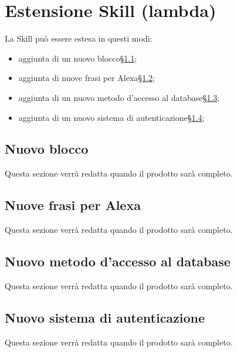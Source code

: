 \section{Estensione Skill (lambda)}
La Skill può essere estesa in questi modi:
\begin{itemize}
    \item aggiunta di un nuovo blocco\S\ref{newBlock};
    \item aggiunta di nuove frasi per Alexa\S\ref{newFrasi};
    \item aggiunta di un nuovo metodo d'accesso al database\S\ref{newAccesso};
    \item aggiunta di un nuovo sistema di autenticazione\S\ref{newAuth};
\end{itemize}
\subsection{Nuovo blocco}\label{newBlock}
Questa sezione verrà redatta quando il prodotto sarà completo.
\subsection{Nuove frasi per Alexa}\label{newFrasi}
Questa sezione verrà redatta quando il prodotto sarà completo.
\subsection{Nuovo metodo d'accesso al database}\label{newAccesso}
Questa sezione verrà redatta quando il prodotto sarà completo.
\subsection{Nuovo sistema di autenticazione}\label{newAuth}
Questa sezione verrà redatta quando il prodotto sarà completo.